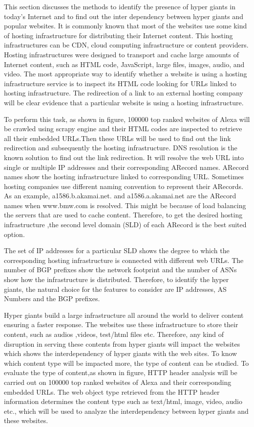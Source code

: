 This section discusses the methods to identify the presence of hyper giants in today's Internet and to find out the inter dependency between hyper giants and popular websites. It is commonly known that most of the websites use some kind of hosting infrastructure for distributing their Internet content. This hosting infrastructures can be CDN, cloud computing infrastructure or content providers. Hosting infrastructures were designed to transport and cache large amounts of Internet content, such as HTML code, JavaScript, large files, images, audio, and video. The most appropriate way to identify whether a website is using a hosting infrastructure service is to inspect its HTML code looking for URLs linked to hosting infrastructure. The redirection of a link to an external hosting company will be clear evidence that a particular website is using a hosting infrastructure. 

To perform this task, as shown in figure, 100000 top ranked websites of Alexa will be crawled using scrapy engine and their HTML codes  are inspected to retrieve all their embedded URLs.Then these URLs will be used to find out the link redirection and subsequently the hosting infrastructure. DNS resolution is the known solution to find out the link redirection. It will resolve the web URL into single or multiple  IP addresses and their corresponding ARecord names. ARecord names show the hosting infrastructure linked to corresponding URL. Sometimes hosting companies use different naming convention to represent their ARecords. As an example, a1586.b.akamai.net. and a1586.a.akamai.net are the ARecord names when www.bmw.com is resolved. This might be because of load balancing the servers that are used to cache content. Therefore, to get the desired hosting infrastructure ,the second level domain (SLD) of each ARecord is the best suited option.

The set of IP addresses for a particular SLD shows the degree to which the corresponding hosting infrastructure is connected with different web URLs. The number of BGP prefixes show the network footprint and the number of ASNs show how the infrastructure is distributed. Therefore, to identify the hyper giants, the natural choice for the features to consider are IP addresses, AS Numbers and the BGP prefixes.

Hyper giants build a large infrastructure all around the world to deliver content ensuring a faster response. The websites use these infrastructure to store their content, such as audios ,videos, test/html files etc. Therefore, any kind of disruption in serving these contents from hyper giants will impact the websites which shows the interdependency of hyper giants with the web sites. To know which content type will be impacted more, the type of content can be studied. To evaluate the type of content,as shown in figure, HTTP header analysis will be carried out on 100000 top ranked websites of Alexa and their corresponding embedded URLs. The web object type retrieved from the HTTP header information determines the content type such as text/html, image, video, audio etc., which will be used to analyze the interdependency between hyper giants and these websites.

